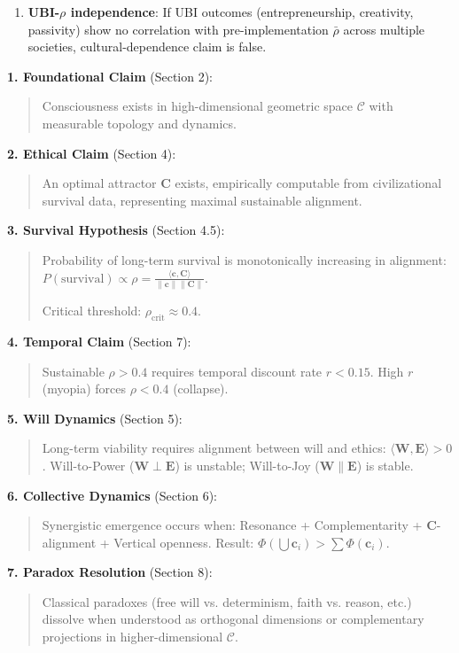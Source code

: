 \documentclass[11pt,a4paper]{article}
\theoremstyle{definition}
\theoremstyle{remark}
\newcommand{\CC}{\mathcal{C}}
\newcommand{\EE}{\mathbf{E}}
\newcommand{\WW}{\mathbf{W}}
\newcommand{\cc}{\mathbf{c}}
\begin{document}
\begin{small}
\begin{enumerate}
\begin{mdframed}[backgroundcolor=blue!5,linewidth=2pt]
\begin{enumerate}
    \item \textbf{UBI-\(\rho\) independence}: If UBI outcomes (entrepreneurship, creativity, passivity) show no correlation with pre-implementation \(\bar{\rho}\) across multiple societies, cultural-dependence claim is false.
\end{enumerate}


\textbf{1. Foundational Claim} (Section 2): 
\begin{quote}
Consciousness exists in high-dimensional geometric space \(\CC\) with measurable topology and dynamics.
\end{quote}

\textbf{2. Ethical Claim} (Section 4):
\begin{quote}
An optimal attractor \(\mathbf{C}\) exists, empirically computable from civilizational survival data, representing maximal sustainable alignment.
\end{quote}

\textbf{3. Survival Hypothesis} (Section 4.5):
\begin{quote}
Probability of long-term survival is monotonically increasing in alignment: \(P(\text{survival}) \propto \rho = \frac{\langle \cc, \mathbf{C} \rangle}{\|\cc\| \|\mathbf{C}\|}\).

Critical threshold: \(\rho_{\text{crit}} \approx 0.4\).
\end{quote}

\textbf{4. Temporal Claim} (Section 7):
\begin{quote}
Sustainable \(\rho > 0.4\) requires temporal discount rate \(r < 0.15\). High \(r\) (myopia) forces \(\rho < 0.4\) (collapse).
\end{quote}

\textbf{5. Will Dynamics} (Section 5):
\begin{quote}
Long-term viability requires alignment between will and ethics: \(\langle \WW, \EE \rangle > 0\). Will-to-Power (\(\WW \perp \EE\)) is unstable; Will-to-Joy (\(\WW \parallel \EE\)) is stable.
\end{quote}

\textbf{6. Collective Dynamics} (Section 6):
\begin{quote}
Synergistic emergence occurs when: Resonance + Complementarity + \(\mathbf{C}\)-alignment + Vertical openness. Result: \(\Phi(\bigcup \cc_i) > \sum \Phi(\cc_i)\).
\end{quote}

\textbf{7. Paradox Resolution} (Section 8):
\begin{quote}
Classical paradoxes (free will vs. determinism, faith vs. reason, etc.) dissolve when understood as orthogonal dimensions or complementary projections in higher-dimensional \(\CC\).
\end{quote}


\end{mdframed}
\end{enumerate}
\end{small}
\end{document}
